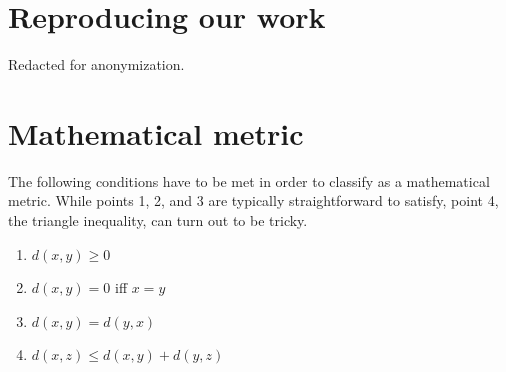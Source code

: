\section{Reproducing our work}
Redacted for anonymization.

\section{Mathematical metric}
\label{sec:metric}
The following conditions have to be met in order to classify as a mathematical
metric.  While points 1, 2, and 3 are typically straightforward to satisfy,
point 4, the triangle inequality, can turn out to be tricky.
\begin{enumerate}
	\item $d(x, y) \geq 0$
	\item $d(x, y) = 0$ iff $x = y$
	\item $d(x, y) = d(y, x)$
	\item $d(x, z) \leq d(x, y) + d(y, z)$
\end{enumerate}

